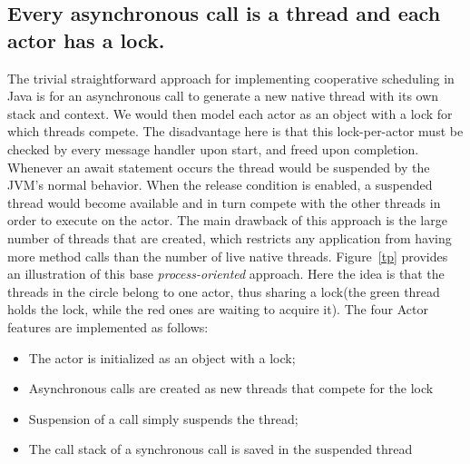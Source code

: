 
\subsection{Every asynchronous call is a thread and each actor has a lock.}
The trivial straightforward approach for implementing cooperative scheduling in Java is for an asynchronous call to generate a new native thread with its own stack and context. We would then model each actor as an object with a lock for which threads compete. The disadvantage here is that this lock-per-actor must be checked by every message handler upon start, and freed upon completion. Whenever an await statement occurs the thread would be suspended by the JVM's normal behavior. When the release condition is enabled, a suspended thread would become available and in turn compete with the other threads in order to execute on the actor. The main drawback of this approach is the large number of threads that are created, which restricts any application from having more method calls than the number of live native threads. Figure~\ref{tp} provides an illustration of this base \textit{process-oriented} approach. Here the idea is that the threads in the circle belong to one actor, thus sharing a lock(the green thread holds the lock, while the red ones are waiting to acquire it). The four Actor features are implemented as follows:

\begin{itemize}
	\item The actor is initialized as an object with a lock;
	\item Asynchronous calls are created as new threads that compete for the lock
	\item Suspension of a call simply suspends the thread;
	\item The call stack of a synchronous call is saved in the suspended thread
\end{itemize}


